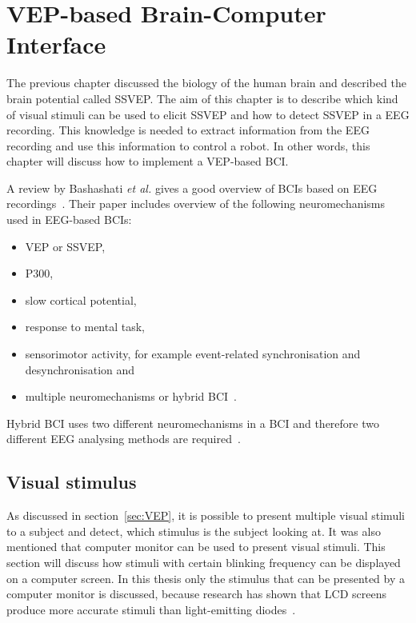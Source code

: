 
\chapter{VEP-based Brain-Computer Interface}

The previous chapter discussed the biology of the human brain and described the brain potential called \gls{SSVEP}. The aim of this chapter is to describe which kind of visual stimuli can be used to elicit \gls{SSVEP} and how to detect \gls{SSVEP} in a \gls{EEG} recording. This knowledge is needed to extract information from the \gls{EEG} recording and use this information to control a robot. In other words, this chapter will discuss how to implement a \gls{VEP}-based \gls{BCI}.

A review by Bashashati \emph{et al.} gives a good overview of \glspl{BCI} based on \gls{EEG} recordings~\cite{bci_comparison}. Their paper includes overview of the following neuromechanisms used in \gls{EEG}-based \glspl{BCI}:
\begin{itemize}
	\item \gls{VEP} or \gls{SSVEP},
	\item P300,
	\item slow cortical potential,
	\item response to mental task,
	\item sensorimotor activity, for example event-related synchronisation and desynchronisation and
	\item multiple neuromechanisms or hybrid \gls{BCI}~\cite{hybrid_bci, hybrid_bci2}.
\end{itemize}
Hybrid \gls{BCI} uses two different neuromechanisms in a \gls{BCI} and therefore two different \gls{EEG} analysing methods are required~\cite{hybrid_bci, hybrid_bci2}.

\section{Visual stimulus}

As discussed in section~\ref{sec:VEP}, it is possible to present multiple visual stimuli to a subject and detect, which stimulus is the subject looking at. It was also mentioned that computer monitor can be used to present visual stimuli. This section will discuss how stimuli with certain blinking frequency can be displayed on a computer screen. In this thesis only the stimulus that can be presented by a computer monitor is discussed, because research has shown that LCD screens produce more accurate stimuli than light-emitting diodes~\cite{lcd_lcd_led}. 

